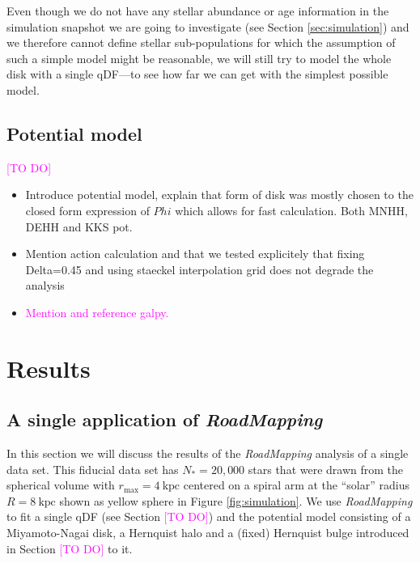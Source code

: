 \documentclass[iop,revtex4,numberedappendix,appendixfloats]{emulateapj}
\newcommand{\RM}{{\sl RoadMapping}}
\newcommand{\Wilma}[1]{\textcolor{Magenta}{#1}}
\begin{document}
Even though we do not have any stellar abundance or age information in the simulation snapshot we are going to investigate (see Section \ref{sec:simulation}) and we therefore cannot define stellar sub-populations for which the assumption of such a simple model might be reasonable, we will still try to model the whole disk with a single qDF---to see how far we can get with the simplest possible model.

\subsection{Potential model}

\Wilma{[TO DO]}

\begin{itemize}
\item Introduce potential model, explain that form of disk was mostly chosen to the closed form expression of $Phi$ which allows for fast calculation. Both MNHH, DEHH and KKS pot.
\item Mention action calculation and that we tested explicitely that fixing Delta=0.45 and using staeckel interpolation grid does not degrade the analysis
\item \Wilma{Mention and reference galpy.}
\end{itemize}

\section{Results}

\subsection{A single application of \RM{}} \label{sec:results_part1}

In this section we will discuss the results of the \RM{} analysis of a single data set. This fiducial data set has $N_*=20,000$ stars that were drawn from the spherical volume with $r_\text{max}=4~\text{kpc}$ centered on a spiral arm at the ``solar'' radius $R=8~\text{kpc}$ shown as yellow sphere in Figure \ref{fig:simulation}. We use \RM{} to fit a single qDF (see Section \Wilma{[TO DO]}) and the potential model consisting of a Miyamoto-Nagai disk, a Hernquist halo and a (fixed) Hernquist bulge introduced in Section \Wilma{[TO DO]} to it.
\end{document}
